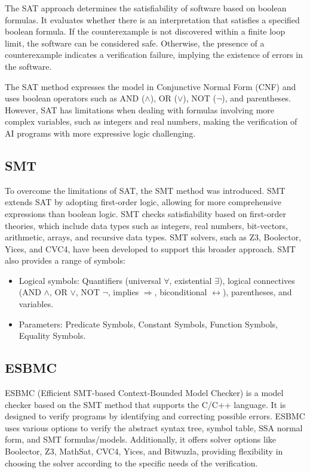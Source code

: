 \documentclass[conference]{IEEEtran}
\begin{document}
The SAT approach determines the satisfiability of software based on boolean formulas. It evaluates whether there is an interpretation that satisfies a specified boolean formula. If the counterexample is not discovered within a finite loop limit, the software can be considered safe. Otherwise, the presence of a counterexample indicates a verification failure, implying the existence of errors in the software.

The SAT method expresses the model in Conjunctive Normal Form (CNF) and uses boolean operators such as AND ($\land$), OR ($\lor$), NOT ($\lnot$), and parentheses. However, SAT has limitations when dealing with formulas involving more complex variables, such as integers and real numbers, making the verification of AI programs with more expressive logic challenging.

\subsection{SMT}

To overcome the limitations of SAT, the SMT method was introduced. SMT extends SAT by adopting first-order logic, allowing for more comprehensive expressions than boolean logic. SMT checks satisfiability based on first-order theories, which include data types such as integers, real numbers, bit-vectors, arithmetic, arrays, and recursive data types. SMT solvers, such as Z3, Boolector, Yices, and CVC4, have been developed to support this broader approach. SMT also provides a range of symbols:
\begin{itemize}
    \item Logical symbols: Quantifiers (universal $\forall$, existential $\exists$), logical connectives (AND $\land$, OR $\lor$, NOT $\lnot$, implies $\Rightarrow$, biconditional $\leftrightarrow$), parentheses, and variables.
    \item Parameters: Predicate Symbols, Constant Symbols, Function Symbols, Equality Symbols.
\end{itemize}

\subsection{ESBMC}

ESBMC (Efficient SMT-based Context-Bounded Model Checker) is a model checker based on the SMT method that supports the C/C++ language. It is designed to verify programs by identifying and correcting possible errors. ESBMC uses various options to verify the abstract syntax tree, symbol table, SSA normal form, and SMT formulas/models. Additionally, it offers solver options like Boolector, Z3, MathSat, CVC4, Yices, and Bitwuzla, providing flexibility in choosing the solver according to the specific needs of the verification.
\end{document}
